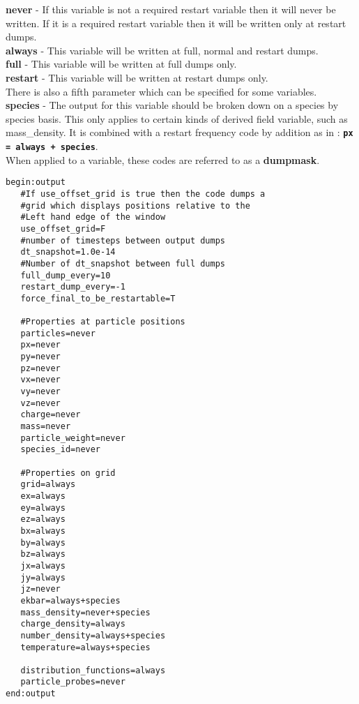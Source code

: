 \documentclass[12pt,a4paper]{article}
\newcommand{\emphtext}{\color{warwickdark} \fontfamily{phv}\selectfont\Large\bf}
\newcommand{\boxverbatim}[1]{\begin{Verbatim}[obeytabs=true,frame=single,
  framerule=0.5mm,rulecolor=\color{warwickmid},formatcom=\color{black},label=#1]}
\newcommand{\inlinecode}[1]{{\color{warwickred} \bf\texttt{#1}}}
\newcommand{\inlineemph}[1]{{\color{warwicklight} \bf{#1}}}
\begin{document}
{\emphtext never} - If this variable is not a required restart variable then it
will never be written. If it is a required restart variable then it will be
written only at restart dumps.\\

{\emphtext always} - This variable will be written at full, normal and restart
dumps.\\

{\emphtext full} - This variable will be written at full dumps only.\\

{\emphtext restart} - This variable will be written at restart dumps only.\\

There is also a fifth parameter which can be specified for some variables.\\

{\emphtext species} - The output for this variable should be broken down on a
species by species basis. This only applies to certain kinds of derived field
variable, such as mass\_density. It is combined with a restart frequency code
by addition as in : \inlinecode{px = always + species}.\\

When applied to a variable, these codes are referred to as a
\inlineemph{dumpmask}.\\

\boxverbatim{output block}
begin:output
   #If use_offset_grid is true then the code dumps a
   #grid which displays positions relative to the
   #Left hand edge of the window
   use_offset_grid=F
   #number of timesteps between output dumps
   dt_snapshot=1.0e-14
   #Number of dt_snapshot between full dumps
   full_dump_every=10
   restart_dump_every=-1
   force_final_to_be_restartable=T

   #Properties at particle positions
   particles=never
   px=never
   py=never
   pz=never
   vx=never
   vy=never
   vz=never
   charge=never
   mass=never
   particle_weight=never
   species_id=never

   #Properties on grid
   grid=always
   ex=always
   ey=always
   ez=always
   bx=always
   by=always
   bz=always
   jx=always
   jy=always
   jz=never
   ekbar=always+species
   mass_density=never+species
   charge_density=always
   number_density=always+species
   temperature=always+species

   distribution_functions=always
   particle_probes=never
end:output
\end{Verbatim}
\end{document}
